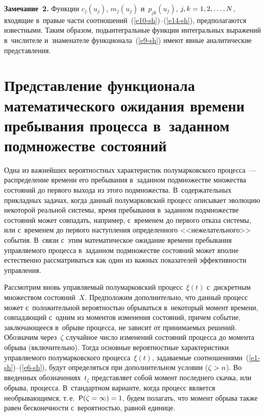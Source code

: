 \begin{multicols}{2}
\smallskip

\noindent
\textbf{Замечание~2.} Функции $c_j(u_j)$, $m_j(u_j)$ и~$p_{jk}(u_j)$, 
$j,k\hm=1,2,\dots,N$, входящие в~правые части соотношений~(\ref{e10-sh})--(\ref{e14-sh}), предполагаются 
известными. Таким образом, подынтегральные функции интегральных выражений 
в~числителе и~знаменателе функционала~(\ref{e9-sh}) имеют явные аналитические представления.

\section{Представление функционала математического ожидания времени пребывания 
процесса в~заданном подмножестве состояний}

Одна из важнейших вероятностных характеристик полумарковского процесса~--- 
распределение времени его пребывания в~заданном подмножестве множества со\-сто\-яний 
до первого выхода из этого подмножества. В~содержательных прикладных задачах, 
когда данный полумарковский процесс описывает эволюцию некоторой реальной 
системы, время пребывания в~заданном подмножестве состояний может совпадать, 
например, с~временем до первого отказа системы, или с~временем до первого 
наступления определенного <<нежелательного>> события. В~связи с~этим 
математическое ожидание времени пребывания управляемого процесса в~заданном 
подмножестве состояний может вполне естественно рассматриваться как один из 
важных показателей эффективности управления.

Рассмотрим вновь управляемый полумарковский процесс~$\xi(t)$ с~дискретным 
множеством состояний~$X$. Предположим дополнительно, что данный процесс может 
с~положительной вероятностью обрываться в~некоторый момент времени, совпадающий 
с~одним из моментов изменения состояний, причем событие, заключающееся в~обрыве 
процесса, не зависит от принимаемых решений. Обозначим через~$\zeta$ случайное 
число изменений состояний процесса до момента обрыва (включительно). Тогда 
основные вероятностные характеристики управ\-ля\-емо\-го полумарковского процесса~$\xi(t)$, 
за\-да\-ва\-емые соотношениями~(\ref{e1-sh})--(\ref{e6-sh}), будут определяться при 
дополнительном условии ($\zeta\hm>n$). Во введенных обозначениях~$t_\zeta$ 
представляет собой момент последнего скачка, или обрыва, процесса. В~стандартном 
варианте, когда процесс является необрывающимся, т.\,е.\ 
$\mathsf{P}(\zeta\hm=\infty)\hm=1$, будем полагать, что момент обрыва также равен бес\-ко\-неч\-ности 
с~ве\-ро\-ят\-ностью, равной единице.


\end{multicols}
